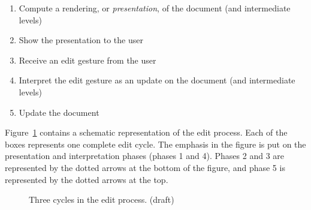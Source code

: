 \begin{enumerate}
\item Compute a rendering, or {\it presentation}, of the document (and intermediate levels)
\item Show the presentation to the user
\item Receive an edit gesture from the user
\item Interpret the edit gesture as an update on the document (and intermediate levels)
\item Update the document
\end{enumerate}

Figure~\ref{simpleeditprocess} contains a schematic representation of the edit process. Each of the boxes represents one complete edit cycle. The emphasis in the figure is put on the presentation and interpretation phases (phases 1 and 4). Phases 2 and 3 are represented by the dotted arrows at the bottom of the figure, and phase 5 is represented by the dotted arrows at the top.

\begin{figure}
\begin{small}
\begin{center}
\begin{center}
\begin{scriptsize}
\end{scriptsize}
\end{center}\caption{Three cycles in the edit process. (draft)}\label{simpleeditprocess} 
\end{center}
\end{small}
\end{figure}

